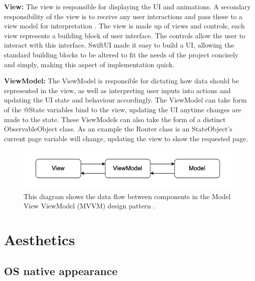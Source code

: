 \documentclass{l4proj}
\begin{document}
\textbf{View:} The view is responsible for displaying the UI and animations. A secondary responsibility of the view is to receive any user interactions and 
pass these to a view model for interpretation \citep{bulavin_modern_2020}. The view is made up of views and controls, each view represents a building block of
user interface. The controls allow the user to interact with this interface. SwiftUI made it easy to build a UI, allowing the standard building blocks to be 
altered to fit the needs of the project concisely and simply, making this aspect of implementation quick.

\textbf{ViewModel:} The ViewModel is responsible for dictating how data should be represented in the view, as well as interpreting user inputs into actions 
and updating the UI state and behaviour accordingly. The ViewModel can take form of the @State variables bind to the view, updating the 
UI anytime changes are made to the state. These ViewModels can also take the form of a distinct ObservableObject class. As an example the Router class is an 
StateObject's current page variable will change, updating the view to show the requested page. 

\begin{figure}
    \centering
    \includegraphics[scale=0.5]{images/MVVMDataFlow.png}    
    \caption{This diagram shows the data flow between components in the Model View ViewModel (MVVM) design pattern 
    \citep{bulavin_modern_2020}.}
    \label{fig:MVVMDataFlow} 
\end{figure}


\section{Aesthetics}

\subsection{OS native appearance}
\end{document}
